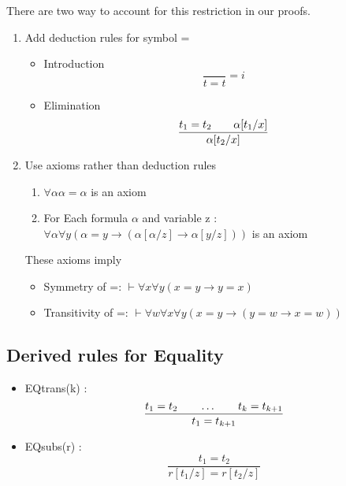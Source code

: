 \documentclass{article}
\begin{document}
There are two way to account for this restriction in our proofs.
\begin{enumerate}
\item Add deduction rules for symbol = 
\begin{itemize}
\item Introduction \[ \frac{}{t=t} = i\]
\item Elimination \[ \frac{t_1 = t_2 \hspace{0.7cm} \alpha[t_1/x]}{\alpha[t_2/x]}\]
\end{itemize}
\item Use axioms rather than deduction rules
\begin{enumerate}
\item \(\forall \alpha \alpha = \alpha\) is an axiom 
\item For Each formula \(\alpha\) and variable z :  \(\forall\alpha \forall y ( \alpha = y \rightarrow (\alpha [\alpha/z] \rightarrow \alpha[y/z]))\) is an axiom 
\end{enumerate}
These axioms imply 
\begin{itemize}
\item Symmetry of =: \(\vdash \forall x \forall y (x = y \rightarrow y = x)\)
\item Transitivity of =: \(\vdash \forall w \forall x \forall y (x = y \rightarrow (y = w \rightarrow x = w))\)
\end{itemize}
\end{enumerate}

\subsection{Derived rules for Equality}
\begin{itemize}
\item EQtrans(k) : $$ \frac{t_1 = t_2 \hspace{0.7cm} \ldots \hspace{0.7cm} t_k = t_{k+1}}{t_1 = t_{k+1}}$$
\item EQsubs(r) : $$ \frac{t_1 = t_2}{r[t_1/z] = r[t_2/z]}$$
\end{itemize}
\end{document}
